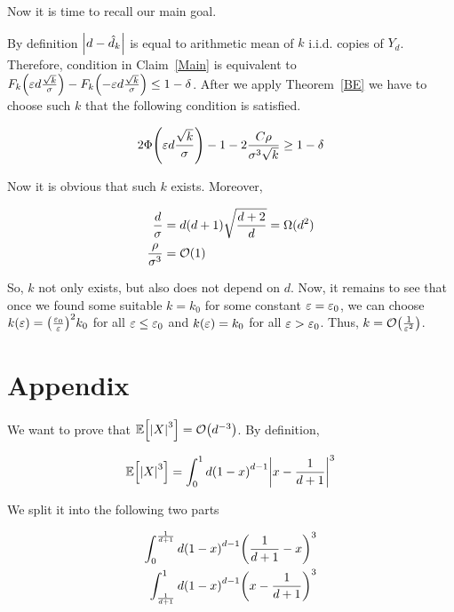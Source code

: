 Now it is time to recall our main goal.

By definition $\abs*{d - \hat d_k}$ is equal to arithmetic mean of $k$ i.i.d. copies of $Y_d$. Therefore, condition in Claim~\ref{Main} is equivalent to $F_k\parens*{\eps d \frac{\sqrt{k}}{\sigma}} - F_k\parens*{- \eps d \frac{\sqrt{k}}{\sigma}} \leq 1 - \delta$. After we apply Theorem~\ref{BE} we have to choose such $k$ that the following condition is satisfied.

\begin{equation}
	2 \Phi \parens*{ \eps d \frac{\sqrt{k}}{\sigma} } - 1 - 2\frac{C \rho}{\sigma^3 \sqrt{k}} \geq 1 - \delta
\end{equation}

Now it is obvious that such $k$ exists. Moreover,

\begin{align*}
	\frac{d}{\sigma}      & = d(d + 1)\sqrt{\frac{d + 2}{d}} = \Omega(d^2) \\
	\frac{\rho}{\sigma^3} & = \BigO(1)
\end{align*}

So, $k$ not only exists, but also does not depend on $d$. Now, it remains to see that once we found some suitable $k = k_0$ for some constant $\eps = \eps_0$, we can choose $k(\eps) = \parens*{\frac{\eps_0}{\eps}}^2 k_0$ for all $\eps \leq \eps_0$ and $k(\eps) = k_0$ for all $\eps > \eps_0$. Thus, $k = \BigO \parens*{\frac{1}{\eps^2}}$.

\appendix

\section{Appendix}\label{App}

We want to prove that $\Ex{\abs*{X}^3} = \BigO \parens*{d^{-3}}$. By definition,

\begin{equation*}
	\Ex{\abs*{X}^3} = \int_{0}^{1} d \parens*{1 - x}^{d - 1} \abs*{x - \frac{1}{d + 1}}^3
\end{equation*}

We split it into the following two parts

\begin{align}
	\int_{0}^{\frac{1}{d + 1}} d \parens*{1 - x}^{d - 1} \parens*{\frac{1}{d + 1} - x}^3 \label{XSmall} \\
	\int_{\frac{1}{d + 1}}^{1} d \parens*{1 - x}^{d - 1} \parens*{x - \frac{1}{d + 1}}^3 \label{XLarge}
\end{align}


